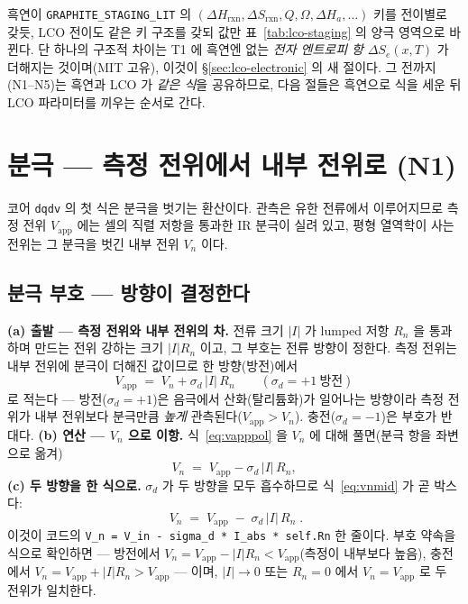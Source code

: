 \documentclass[11pt,a4paper]{article}
\newcommand{\app}{\mathrm{app}}
\newcommand{\rxn}{\mathrm{rxn}}
\newcommand{\code}[1]{\texttt{#1}}
\begin{document}
흑연이 \code{GRAPHITE\_STAGING\_LIT} 의 $(\Delta H_\rxn,\Delta S_\rxn,Q,\Omega,\Delta H_a,\dots)$ 키를 전이별로 갖듯,
LCO 전이도 같은 키 구조를 갖되 값만 표~\ref{tab:lco-staging} 의 양극 영역으로 바뀐다. 단 하나의 구조적 차이는 T1 에
흑연엔 없는 \emph{전자 엔트로피 항} $\Delta S_e(x,T)$ 가 더해지는 것이며(MIT 고유), 이것이 \S\ref{sec:lco-electronic}
의 새 절이다. 그 전까지(N1--N5)는 흑연과 LCO 가 \emph{같은 식}을 공유하므로, 다음 절들은 흑연으로 식을 세운 뒤 LCO
파라미터를 끼우는 순서로 간다.

\section{분극 — 측정 전위에서 내부 전위로 (N1)}\label{sec:pol}
코어 \code{dqdv} 의 첫 식은 분극을 벗기는 환산이다. 관측은 유한 전류에서 이루어지므로 측정 전위 $V_\app$ 에는 셀의
직렬 저항을 통과한 IR 분극이 실려 있고, 평형 열역학이 사는 전위는 그 분극을 벗긴 내부 전위 $V_n$ 이다.

\subsection{분극 부호 — 방향이 결정한다}
\textbf{(a) 출발 — 측정 전위와 내부 전위의 차.} 전류 크기 $|I|$ 가 lumped 저항 $R_n$ 을 통과하며 만드는 전위 강하는
크기 $|I|R_n$ 이고, 그 부호는 전류 방향이 정한다. 측정 전위는 내부 전위에 분극이 더해진 값이므로 한 방향(방전)에서
\begin{equation}
V_\app\;=\;V_n+\sigma_d\,|I|\,R_n
\qquad(\sigma_d=+1\ \text{방전})
\label{eq:vapppol}
\end{equation}
로 적는다 — 방전($\sigma_d=+1$)은 음극에서 산화(탈리튬화)가 일어나는 방향이라 측정 전위가 내부 전위보다 분극만큼
\emph{높게} 관측된다($V_\app>V_n$). 충전($\sigma_d=-1$)은 부호가 반대다. \textbf{(b) 연산 — $V_n$ 으로 이항.}
식~\eqref{eq:vapppol} 을 $V_n$ 에 대해 풀면(분극 항을 좌변으로 옮겨)
\begin{equation}
V_n\;=\;V_\app-\sigma_d\,|I|\,R_n,
\label{eq:vnmid}
\end{equation}
\textbf{(c) 두 방향을 한 식으로.} $\sigma_d$ 가 두 방향을 모두 흡수하므로 식~\eqref{eq:vnmid} 가 곧 박스다:
\begin{equation}
\boxed{\;V_n\;=\;V_\app\;-\;\sigma_d\,|I|\,R_n\;.}
\label{eq:vn}
\end{equation}
이것이 코드의 \code{V\_n = V\_in - sigma\_d * I\_abs * self.Rn} 한 줄이다. 부호 약속을 식으로 확인하면 —
방전에서 $V_n=V_\app-|I|R_n<V_\app$(측정이 내부보다 높음), 충전에서 $V_n=V_\app+|I|R_n>V_\app$ — 이며,
$|I|\to0$ 또는 $R_n=0$ 에서 $V_n=V_\app$ 로 두 전위가 일치한다.
\end{document}
